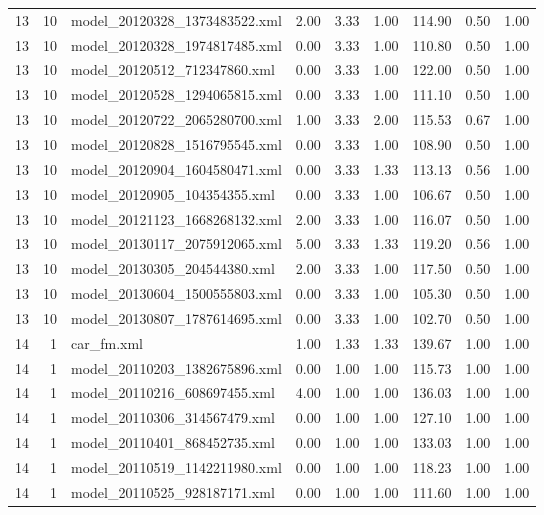 \begin{table}[ht]
\begin{tabular}{rrlrrrrrr}
   13 &  10 & model\_20120328\_1373483522.xml & 2.00 & 3.33 & 1.00 & 114.90 & 0.50 & 1.00 \\ 
   13 &  10 & model\_20120328\_1974817485.xml & 0.00 & 3.33 & 1.00 & 110.80 & 0.50 & 1.00 \\ 
   13 &  10 & model\_20120512\_712347860.xml & 0.00 & 3.33 & 1.00 & 122.00 & 0.50 & 1.00 \\ 
   13 &  10 & model\_20120528\_1294065815.xml & 0.00 & 3.33 & 1.00 & 111.10 & 0.50 & 1.00 \\ 
   13 &  10 & model\_20120722\_2065280700.xml & 1.00 & 3.33 & 2.00 & 115.53 & 0.67 & 1.00 \\ 
   13 &  10 & model\_20120828\_1516795545.xml & 0.00 & 3.33 & 1.00 & 108.90 & 0.50 & 1.00 \\ 
   13 &  10 & model\_20120904\_1604580471.xml & 0.00 & 3.33 & 1.33 & 113.13 & 0.56 & 1.00 \\ 
   13 &  10 & model\_20120905\_104354355.xml & 0.00 & 3.33 & 1.00 & 106.67 & 0.50 & 1.00 \\ 
   13 &  10 & model\_20121123\_1668268132.xml & 2.00 & 3.33 & 1.00 & 116.07 & 0.50 & 1.00 \\ 
   13 &  10 & model\_20130117\_2075912065.xml & 5.00 & 3.33 & 1.33 & 119.20 & 0.56 & 1.00 \\ 
   13 &  10 & model\_20130305\_204544380.xml & 2.00 & 3.33 & 1.00 & 117.50 & 0.50 & 1.00 \\ 
   13 &  10 & model\_20130604\_1500555803.xml & 0.00 & 3.33 & 1.00 & 105.30 & 0.50 & 1.00 \\ 
   13 &  10 & model\_20130807\_1787614695.xml & 0.00 & 3.33 & 1.00 & 102.70 & 0.50 & 1.00 \\ 
   14 &   1 & car\_fm.xml & 1.00 & 1.33 & 1.33 & 139.67 & 1.00 & 1.00 \\ 
   14 &   1 & model\_20110203\_1382675896.xml & 0.00 & 1.00 & 1.00 & 115.73 & 1.00 & 1.00 \\ 
   14 &   1 & model\_20110216\_608697455.xml & 4.00 & 1.00 & 1.00 & 136.03 & 1.00 & 1.00 \\ 
   14 &   1 & model\_20110306\_314567479.xml & 0.00 & 1.00 & 1.00 & 127.10 & 1.00 & 1.00 \\ 
   14 &   1 & model\_20110401\_868452735.xml & 0.00 & 1.00 & 1.00 & 133.03 & 1.00 & 1.00 \\ 
   14 &   1 & model\_20110519\_1142211980.xml & 0.00 & 1.00 & 1.00 & 118.23 & 1.00 & 1.00 \\ 
   14 &   1 & model\_20110525\_928187171.xml & 0.00 & 1.00 & 1.00 & 111.60 & 1.00 & 1.00 \\ 

\end{tabular}
\end{table}
